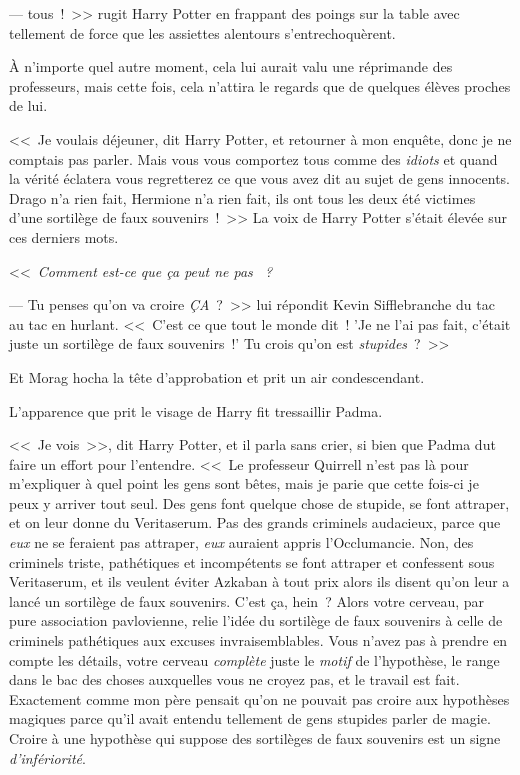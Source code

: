 ---  tous~!~>> rugit Harry Potter en frappant des poings sur la table avec tellement de force que les assiettes alentours s'entrechoquèrent.

À n'importe quel autre moment, cela lui aurait valu une réprimande des professeurs, mais cette fois, cela n'attira le regards que de quelques élèves proches de lui.

<<~Je voulais déjeuner, dit Harry Potter, et retourner à mon enquête, donc je ne comptais pas parler. Mais vous vous comportez tous comme des \emph{idiots} et quand la vérité éclatera vous regretterez ce que vous avez dit au sujet de gens innocents. Drago n'a rien fait, Hermione n'a rien fait, ils ont tous les deux été victimes d'une sortilège de faux souvenirs~!~>> La voix de Harry Potter s'était élevée sur ces derniers mots.

<<~\emph{Comment est-ce que ça peut ne pas ~?}

--- Tu penses qu'on va croire \emph{ÇA}~?~>> lui répondit Kevin Sifflebranche du tac au tac en hurlant. <<~C'est ce que tout le monde dit~! 'Je ne l'ai pas fait, c'était juste un sortilège de faux souvenirs~!' Tu crois qu'on est \emph{stupides}~?~>>

Et Morag hocha la tête d'approbation et prit un air condescendant.

L'apparence que prit le visage de Harry fit tressaillir Padma.

<<~Je vois~>>, dit Harry Potter, et il parla sans crier, si bien que Padma dut faire un effort pour l'entendre. <<~Le professeur Quirrell n'est pas là pour m'expliquer à quel point les gens sont bêtes, mais je parie que cette fois-ci je peux y arriver tout seul. Des gens font quelque chose de stupide, se font attraper, et on leur donne du Veritaserum. Pas des grands criminels audacieux, parce que \emph{eux} ne se feraient pas attraper, \emph{eux} auraient appris l'Occlumancie. Non, des criminels triste, pathétiques et incompétents se font attraper et confessent sous Veritaserum, et ils veulent éviter Azkaban à tout prix alors ils disent qu'on leur a lancé un sortilège de faux souvenirs. C'est ça, hein~? Alors votre cerveau, par pure association pavlovienne, relie l'idée du sortilège de faux souvenirs à celle de criminels pathétiques aux excuses invraisemblables. Vous n'avez pas à prendre en compte les détails, votre cerveau \emph{complète} juste le \emph{motif} de l'hypothèse, le range dans le bac des choses auxquelles vous ne croyez pas, et le travail est fait. Exactement comme mon père pensait qu'on ne pouvait pas croire aux hypothèses magiques parce qu'il avait entendu tellement de gens stupides parler de magie. Croire à une hypothèse qui suppose des sortilèges de faux souvenirs est un signe \emph{d'infériorité}.

